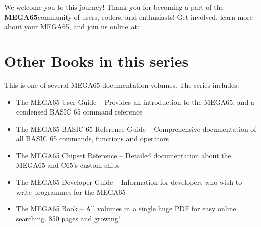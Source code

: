 We welcome you to this journey! Thank you for becoming a part of the {\bf MEGA65}community of users, coders, and enthusiasts! Get involved, learn more about your MEGA65, and join us online at:


\section{Other Books in this series}

This is one of several MEGA65 documentation volumes.  The series includes:

\begin{itemize}
	\item The MEGA65 User Guide -- Provides an introduction to the MEGA65, and a condensed BASIC 65 command reference
	\item The MEGA65 BASIC 65 Reference Guide -- Comprehensive documentation of all BASIC 65 commands, functions and operators
	\item The MEGA65 Chipset Reference -- Detailed documentation about the MEGA65 and C65's custom chips
	\item The MEGA65 Developer Guide -- Information for developers who wish to write programmes for the MEGA65
	\item The MEGA65 Book -- All volumes in a single huge PDF for easy online searching. 850 pages and growing!
\end{itemize}
